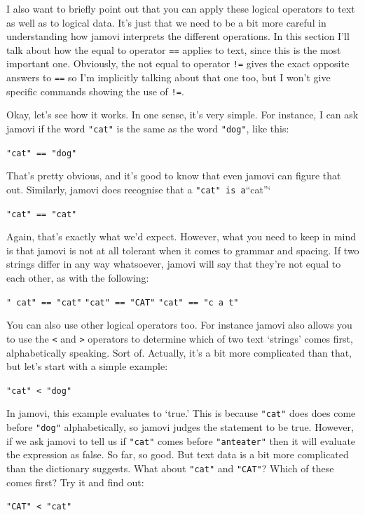 \documentclass[
]{book}
\begin{document}
I also want to briefly point out that you can apply these logical operators to text as well as to logical data. It's just that we need to be a bit more careful in understanding how jamovi interprets the different operations. In this section I'll talk about how the equal to operator \texttt{==} applies to text, since this is the most important one. Obviously, the not equal to operator \texttt{!=} gives the exact opposite answers to \texttt{==} so I'm implicitly talking about that one too, but I won't give specific commands showing the use of \texttt{!=}.

Okay, let's see how it works. In one sense, it's very simple. For instance, I can ask jamovi if the word \texttt{"cat"} is the same as the word \texttt{"dog"}, like this:

\texttt{"cat"\ ==\ "dog"}

That's pretty obvious, and it's good to know that even jamovi can figure that out. Similarly, jamovi does recognise that a \texttt{"cat"\ is\ a}``cat''`

\texttt{"cat"\ ==\ "cat"}

Again, that's exactly what we'd expect. However, what you need to keep in mind is that jamovi is not at all tolerant when it comes to grammar and spacing. If two strings differ in any way whatsoever, jamovi will say that they're not equal to each other, as with the following:

\texttt{"\ cat"\ ==\ "cat"}
\texttt{"cat"\ ==\ "CAT"}
\texttt{"cat"\ ==\ "c\ a\ t"}

You can also use other logical operators too. For instance jamovi also allows you to use the \texttt{\textless{}} and \texttt{\textgreater{}} operators to determine which of two text `strings' comes first, alphabetically speaking. Sort of. Actually, it's a bit more complicated than that, but let's start with a simple example:

\texttt{"cat"\ \textless{}\ "dog"}

In jamovi, this example evaluates to `true.' This is because \texttt{"cat"} does does come before \texttt{"dog"} alphabetically, so jamovi judges the statement to be true. However, if we ask jamovi to tell us if \texttt{"cat"} comes before \texttt{"anteater"} then it will evaluate the expression as false. So far, so good. But text data is a bit more complicated than the dictionary suggests. What about \texttt{"cat"} and \texttt{"CAT"}? Which of these comes first? Try it and find out:

\texttt{"CAT"\ \textless{}\ "cat"}
\end{document}
